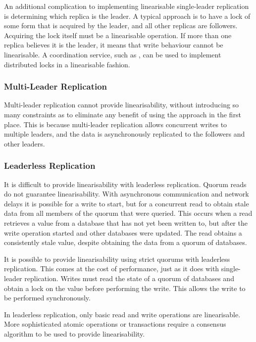 An additional complication to implementing linearisable single-leader replication is determining which replica is the leader.
A typical approach is to have a lock of some form that is acquired by the leader, and all other replicas are followers.
Acquiring the lock itself must be a linearisable operation.
If more than one replica believes it is the leader, it means that write behaviour cannot be linearisable.
A coordination service, such as ,
can be used to implement distributed locks in a linearisable fashion.

\subsubsection{Multi-Leader Replication}
Multi-leader replication cannot provide linearisability,
without introducing so many constraints as to eliminate any benefit of using the approach in the first place.
This is because multi-leader replication allows concurrent writes to multiple leaders,
and the data is asynchronously replicated to the followers and other leaders.

\subsubsection{Leaderless Replication}
It is difficult to provide linearisability with leaderless replication.
Quorum reads \cite{distributed2-notes} do not guarantee linearisability.
With asynchronous communication and network delays it is possible for a write to start,
but for a concurrent read to obtain stale data from all members of the quorum that were queried.
This occurs when a read retrieves a value from a database that has not yet been written to,
but after the write operation started and other databases were updated.
The read obtains a consistently stale value, despite obtaining the data from a quorum of databases.

It is possible to provide linearisability using strict quorums with leaderless replication.
This comes at the cost of performance, just as it does with single-leader replication.
Writes must read the state of a quorum of databases and obtain a lock on the value before performing the write.
This allows the write to be performed synchronously.

In leaderless replication, only basic read and write operations are linearisable.
More sophisticated atomic operations or transactions require a consensus algorithm to be used to provide linearisability.

